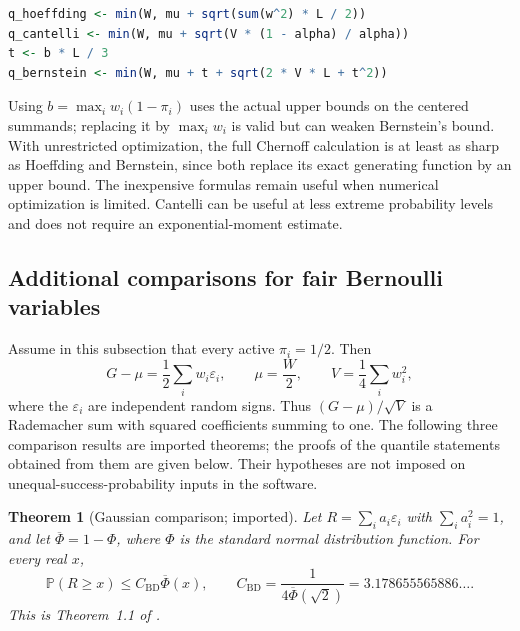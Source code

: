 \documentclass[11pt,letterpaper]{article}
\numberwithin{equation}{section}
\newtheorem{theorem}{Theorem}[section]
\theoremstyle{definition}
\theoremstyle{remark}
\begin{document}
\begin{lstlisting}[language=R]
q_hoeffding <- min(W, mu + sqrt(sum(w^2) * L / 2))
q_cantelli <- min(W, mu + sqrt(V * (1 - alpha) / alpha))
t <- b * L / 3
q_bernstein <- min(W, mu + t + sqrt(2 * V * L + t^2))
\end{lstlisting}

Using $b=\max_iw_i(1-\pi_i)$ uses the actual upper bounds on the centered
summands; replacing it by $\max_iw_i$ is valid but can weaken Bernstein's
bound. With unrestricted optimization, the full Chernoff calculation is at
least as sharp as Hoeffding and Bernstein, since both replace its exact
generating function by an upper bound. The inexpensive formulas remain useful
when numerical optimization is limited. Cantelli can be useful at less extreme
probability levels and does not require an exponential-moment estimate.

\subsection{Additional comparisons for fair Bernoulli variables}
\label{sec:rademacher-bounds}

Assume in this subsection that every active $\pi_i=1/2$. Then
\begin{equation}
  G-\mu=\frac12\sum_iw_i\varepsilon_i,\qquad
  \mu=\frac W2,\qquad V=\frac14\sum_iw_i^2,
  \label{eq:fair-bernoulli-normalization}
\end{equation}
where the $\varepsilon_i$ are independent random signs. Thus
$(G-\mu)/\sqrt V$ is a Rademacher sum with squared coefficients summing to one.
The following three comparison results are imported theorems; the proofs of
the quantile statements obtained from them are given below. Their hypotheses
are not imposed on unequal-success-probability inputs in the software.

\begin{theorem}[Gaussian comparison; imported]
\label{thm:bentkus-dzindzalieta}
Let $R=\sum_i a_i\varepsilon_i$ with $\sum_i a_i^2=1$, and let
$\overline\Phi=1-\Phi$, where $\Phi$ is the standard normal distribution
function. For every real $x$,
\begin{equation}
  \mathbb{P}(R\ge x)\le C_{\mathrm{BD}}\overline\Phi(x),\qquad
  C_{\mathrm{BD}}=\frac{1}{4\overline\Phi(\sqrt2)}
                =3.178655565886\ldots.
  \label{eq:bd-tail}
\end{equation}
This is Theorem~1.1 of \cite{bentkusdzindzalieta2015}.
\end{theorem}
\end{document}
